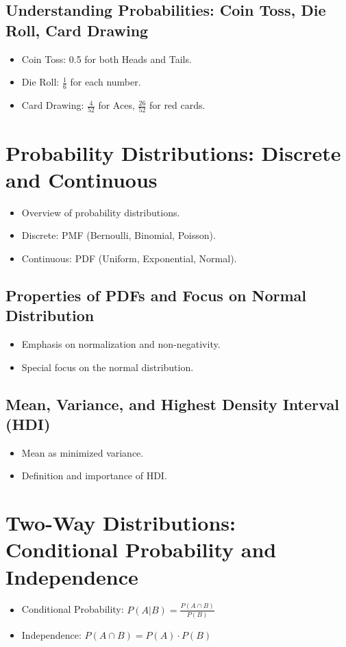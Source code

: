 \documentclass{article}
\begin{document}
\subsection*{Understanding Probabilities: Coin Toss, Die Roll, Card Drawing}
\begin{itemize}
  \item Coin Toss: 0.5 for both Heads and Tails.
  \item Die Roll: \( \frac{1}{6} \) for each number.
  \item Card Drawing: \( \frac{4}{52} \) for Aces, \( \frac{26}{52} \) for red cards.
\end{itemize}

\section*{Probability Distributions: Discrete and Continuous}
\begin{itemize}
  \item Overview of probability distributions.
  \item Discrete: PMF (Bernoulli, Binomial, Poisson).
  \item Continuous: PDF (Uniform, Exponential, Normal).
\end{itemize}

\subsection*{Properties of PDFs and Focus on Normal Distribution}
\begin{itemize}
  \item Emphasis on normalization and non-negativity.
  \item Special focus on the normal distribution.
\end{itemize}

\subsection*{Mean, Variance, and Highest Density Interval (HDI)}
\begin{itemize}
  \item Mean as minimized variance.
  \item Definition and importance of HDI.
\end{itemize}

\section*{Two-Way Distributions: Conditional Probability and Independence}
\begin{itemize}
  \item Conditional Probability: \( P(A | B) = \frac{P(A \cap B)}{P(B)} \)
  \item Independence: \( P(A \cap B) = P(A) \cdot P(B) \)
\end{itemize}
\end{document}
